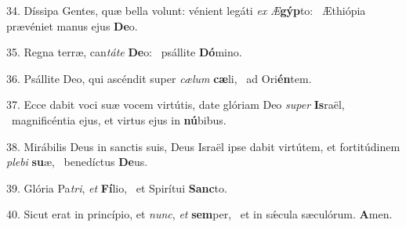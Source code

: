 34. Díssipa Gentes, quæ bella volunt: vénient legáti \textit{ex} \textit{Æ}\textbf{gýp}to: \ast\  Æthiópia prævéniet manus ejus \textbf{De}o.\

35. Regna terræ, can\textit{tá}\textit{te} \textbf{De}o: \ast\  psállite \textbf{Dó}mino.\

36. Psállite Deo, qui ascéndit super \textit{cæ}\textit{lum} \textbf{cæ}li, \ast\  ad Ori\textbf{én}tem.\

37. Ecce dabit voci suæ vocem virtútis, date glóriam Deo \textit{su}\textit{per} \textbf{Is}raël, \ast\  magnificéntia ejus, et virtus ejus in \textbf{nú}bibus.\

38. Mirábilis Deus in sanctis suis, Deus Israël ipse dabit virtútem, et fortitúdinem \textit{ple}\textit{bi} \textbf{su}æ, \ast\  benedíctus \textbf{De}us.\

39. Glória Pa\textit{tri}, \textit{et} \textbf{Fí}lio, \ast\  et Spirítui \textbf{Sanc}to.\

40. Sicut erat in princípio, et \textit{nunc}, \textit{et} \textbf{sem}per, \ast\  et in sǽcula sæculórum. \textbf{A}men.\

